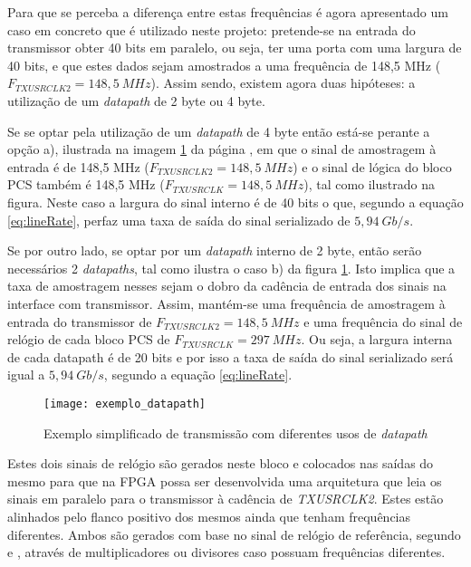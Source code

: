 Para que se perceba a diferença entre estas frequências é agora apresentado um caso em concreto que é utilizado neste projeto: pretende-se na entrada do transmissor obter 40 bits em paralelo, ou seja, ter uma porta com uma largura de 40 bits, e que estes dados sejam amostrados a uma frequência de 148,5 MHz ($F_{TXUSRCLK2} = 148,5\ MHz$). Assim sendo, existem agora duas hipóteses: a utilização de um \textit{datapath} de 2 byte ou 4 byte.

Se se optar pela utilização de um \textit{datapath} de 4 byte então está-se perante a opção a), ilustrada na imagem \ref{fig:exemplo_datapaths} da página \pageref{fig:exemplo_datapaths}, em que o sinal de amostragem à entrada é de 148,5 MHz ($F_{TXUSRCLK2} = 148,5\ MHz$) e o sinal de lógica do bloco PCS também é 148,5 MHz ($F_{TXUSRCLK} = 148,5\ MHz$), tal como ilustrado na figura. Neste caso a largura do sinal interno é de 40 bits o que, segundo a equação \ref{eq:lineRate}, perfaz uma taxa de saída do sinal serializado de $5,94\ Gb/s$.

Se por outro lado, se optar por um \textit{datapath} interno de 2 byte, então serão necessários 2 \textit{datapaths}, tal como ilustra o caso b) da figura \ref{fig:exemplo_datapaths}. Isto implica que a taxa de amostragem nesses sejam o dobro da cadência de entrada dos sinais na interface com transmissor. Assim, mantém-se uma frequência de amostragem à entrada do transmissor de $F_{TXUSRCLK2} = 148,5\ MHz$ e uma frequência do sinal de relógio de cada bloco PCS de $F_{TXUSRCLK} = 297\ MHz$. Ou seja, a largura interna de cada datapath é de 20 bits e por isso a taxa de saída do sinal serializado será igual a $5,94\ Gb/s$, segundo a equação \ref{eq:lineRate}.

\begin{figure}[h!]
 	\begin{center}
 		\leavevmode
 		\texttt{[image: exemplo\_datapath]}
 		\caption{Exemplo simplificado de transmissão com diferentes usos de \textit{datapath}}
 		\label{fig:exemplo_datapaths}
 	\end{center}
 \end{figure}

Estes dois sinais de relógio são gerados neste bloco e colocados nas saídas do mesmo para que na FPGA possa ser desenvolvida uma arquitetura que leia os sinais em paralelo para o transmissor à cadência de \textit{TXUSRCLK2}. Estes estão alinhados pelo flanco positivo dos mesmos ainda que tenham frequências diferentes. Ambos são gerados com base no sinal de relógio de referência, segundo \cite{R011} e \cite{R022}, através de multiplicadores ou divisores caso possuam frequências diferentes.


